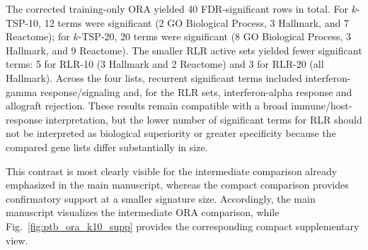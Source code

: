 \documentclass[11pt, a4paper]{article}
\begin{document}
The corrected training-only ORA yielded 40 FDR-significant rows in total. For $k$-TSP-10, 12 terms were significant (2 GO Biological Process, 3 Hallmark, and 7 Reactome); for $k$-TSP-20, 20 terms were significant (8 GO Biological Process, 3 Hallmark, and 9 Reactome). The smaller RLR active sets yielded fewer significant terms: 5 for RLR-10 (3 Hallmark and 2 Reactome) and 3 for RLR-20 (all Hallmark). Across the four lists, recurrent significant terms included interferon-gamma response/signaling and, for the RLR sets, interferon-alpha response and allograft rejection. These results remain compatible with a broad immune/host-response interpretation, but the lower number of significant terms for RLR should not be interpreted as biological superiority or greater specificity because the compared gene lists differ substantially in size.

This contrast is most clearly visible for the intermediate comparison already emphasized in the main manuscript, whereas the compact comparison provides confirmatory support at a smaller signature size. Accordingly, the main manuscript visualizes the intermediate ORA comparison, while Fig.~\ref{fig:ptb_ora_k10_supp} provides the corresponding compact supplementary view.
\end{document}
